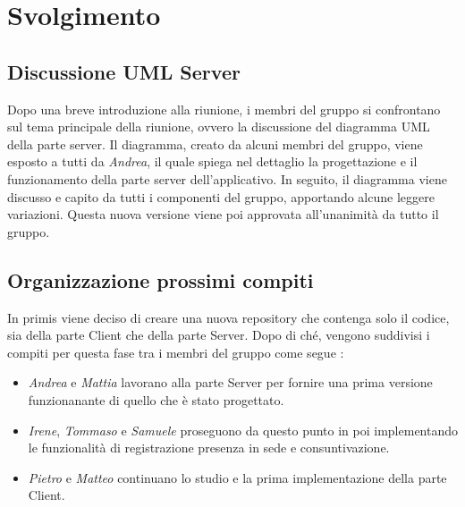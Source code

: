 \section{Svolgimento}
\subsection{Discussione UML Server}
Dopo una breve introduzione alla riunione, 
i membri del gruppo si confrontano sul tema principale della riunione, ovvero la discussione del diagramma UML della parte server.
Il diagramma, creato da alcuni membri del gruppo, viene esposto a tutti da \textit{Andrea}, il quale spiega nel dettaglio la progettazione e il funzionamento della parte server dell'applicativo. 
In seguito, il diagramma viene discusso e capito da tutti i componenti del gruppo, apportando alcune leggere variazioni. 
Questa nuova versione viene poi approvata all'unanimità da tutto il gruppo.
\subsection{Organizzazione prossimi compiti}
In primis viene deciso di creare una nuova repository che contenga solo il codice, sia della parte Client che della parte Server. 
Dopo di ché, vengono suddivisi i compiti per questa fase tra i membri del gruppo come segue :
\begin{itemize}
  \item \textit{Andrea} e \textit{Mattia} lavorano alla parte Server per fornire una prima versione funzionanante di quello che è stato progettato.
  \item \textit{Irene}, \textit{Tommaso} e \textit{Samuele} proseguono da questo punto in poi implementando le funzionalità di registrazione presenza in sede e consuntivazione.
  \item \textit{Pietro} e \textit{Matteo} continuano lo studio e la prima implementazione della parte Client.
\end{itemize}   


